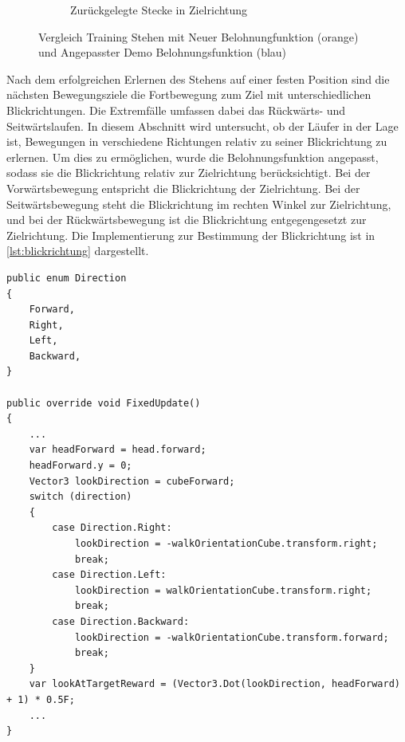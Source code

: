 \begin{figure}[H]
\begin{subfigure}{.49\textwidth}
      \caption{Zurückgelegte Stecke in Zielrichtung}
      \label{fig:126_128_move_target_dir}
    \end{subfigure}
  \caption{Vergleich Training Stehen mit Neuer Belohnungfunktion (orange) und Angepasster Demo Belohnungsfunktion (blau)}
  \label{fig:vergleich_126_128}
\end{figure}

Nach dem erfolgreichen Erlernen des Stehens auf einer festen Position sind die nächsten Bewegungsziele die Fortbewegung zum Ziel mit unterschiedlichen Blickrichtungen. Die Extremfälle umfassen dabei das Rückwärts- und Seitwärtslaufen. In diesem Abschnitt wird untersucht, ob der Läufer in der Lage ist, Bewegungen in verschiedene Richtungen relativ zu seiner Blickrichtung zu erlernen. Um dies zu ermöglichen, wurde die Belohnungsfunktion angepasst, sodass sie die Blickrichtung relativ zur Zielrichtung berücksichtigt. Bei der Vorwärtsbewegung entspricht die Blickrichtung der Zielrichtung. Bei der Seitwärtsbewegung steht die Blickrichtung im rechten Winkel zur Zielrichtung, und bei der Rückwärtsbewegung ist die Blickrichtung entgegengesetzt zur Zielrichtung. Die Implementierung zur Bestimmung der Blickrichtung ist in \ref{lst:blickrichtung} dargestellt.

\begin{lstlisting}[caption={Blickrichtung Enum und Belohnung},captionpos=b,label={lst:blickrichtung}]
public enum Direction
{
    Forward,
    Right,
    Left,
    Backward,
}
    
public override void FixedUpdate()
{
    ...
    var headForward = head.forward;
    headForward.y = 0;
    Vector3 lookDirection = cubeForward;
    switch (direction)
    {
        case Direction.Right:
            lookDirection = -walkOrientationCube.transform.right;
            break;
        case Direction.Left:
            lookDirection = walkOrientationCube.transform.right;
            break;
        case Direction.Backward:
            lookDirection = -walkOrientationCube.transform.forward;
            break;
    }
    var lookAtTargetReward = (Vector3.Dot(lookDirection, headForward) + 1) * 0.5F;
    ...
}
\end{lstlisting}

